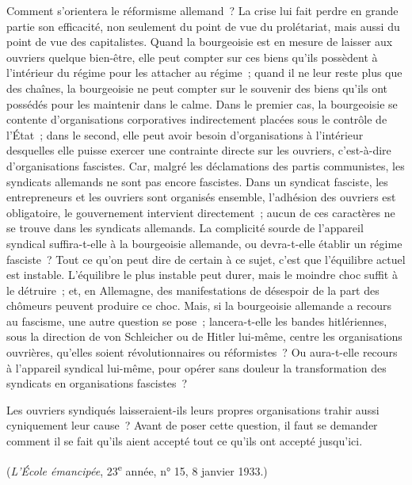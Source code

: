 \documentclass[french,twoside]{book} %
\begin{document}
Comment s'orientera le réformisme allemand ? La crise lui fait perdre en grande partie son efficacité, non seulement du point de vue du prolétariat, mais aussi du point de vue des capitalistes. Quand la bourgeoisie est en mesure de laisser aux ouvriers quelque bien-être, elle peut compter sur ces biens qu'ils possèdent à l'intérieur du régime pour les attacher au régime ; quand il ne leur reste plus que des chaînes, la bourgeoisie ne peut compter sur le souvenir des biens qu'ils ont possédés pour les maintenir dans le calme. Dans le premier cas, la bourgeoisie se contente d'organisations corporatives indirectement placées sous le contrôle de l'État ; dans le second, elle peut avoir besoin d'organisations à l'intérieur desquelles elle puisse exercer une contrainte directe sur les ouvriers, c'est-à-dire d'organisations fascistes. Car, malgré les déclamations des partis communistes, les syndicats allemands ne sont pas encore fascistes. Dans un syndicat fasciste, les entrepreneurs et les ouvriers sont organisés ensemble, l'adhésion des ouvriers est obligatoire, le gouvernement intervient directement ; aucun de ces caractères ne se trouve dans les syndicats allemands. La complicité sourde de l'appareil syndical suffira-t-elle à la bourgeoisie allemande, ou devra-t-elle établir un régime fasciste ? Tout ce qu'on peut dire de certain à ce sujet, c'est que l'équilibre actuel est instable. L'équilibre le plus instable peut durer, mais le moindre choc suffit à le détruire ; et, en Allemagne, des manifestations de désespoir de la part des chômeurs peuvent produire ce choc. Mais, si la bourgeoisie allemande a recours au fascisme, une autre question se pose ; lancera-t-elle les bandes hitlériennes, sous la direction de von Schleicher ou de Hitler lui-même, centre les organisations ouvrières, qu'elles soient révolutionnaires ou réformistes ? Ou aura-t-elle recours à l'appareil syndical lui-même, pour opé­rer sans douleur la transformation des syndicats en organisations fascistes ?\par
Les ouvriers syndiqués laisseraient-ils leurs propres organisations trahir aussi cyniquement leur cause ? Avant de poser cette question, il faut se demander comment il se fait qu'ils aient accepté tout ce qu'ils ont accepté jusqu'ici.\par
({\itshape L'École émancipée}, 23\textsuperscript{e} année, n° 15, 8 janvier 1933.)
\end{document}
